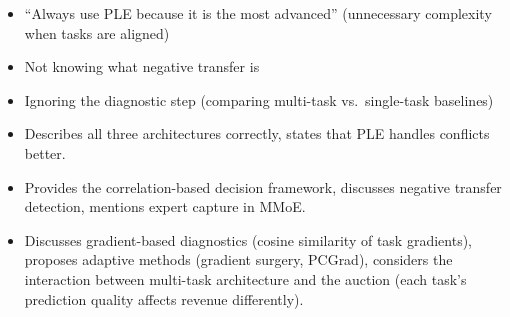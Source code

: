 \begin{interviewq}
\redflags
\begin{itemize}
    \item ``Always use PLE because it is the most advanced'' (unnecessary complexity when tasks are aligned)
    \item Not knowing what negative transfer is
    \item Ignoring the diagnostic step (comparing multi-task vs.\ single-task baselines)
\end{itemize}


\goodgreat
\begin{itemize}
    \item {} Describes all three architectures correctly, states that PLE handles conflicts better.
    \item {} Provides the correlation-based decision framework, discusses negative transfer detection, mentions expert capture in MMoE.
    \item {} Discusses gradient-based diagnostics (cosine similarity of task gradients), proposes adaptive methods (gradient surgery, PCGrad), considers the interaction between multi-task architecture and the auction (each task's prediction quality affects revenue differently).
\end{itemize}

\end{interviewq}


